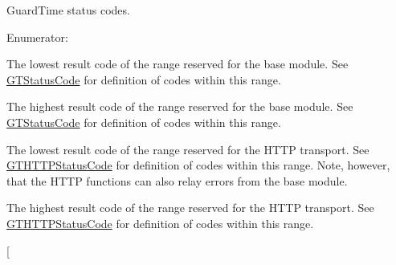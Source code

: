 GuardTime status codes. \begin{Desc}
\item[Enumerator: ]\par
\begin{description}
\item[{\em 
\hypertarget{group__common_gga43b0c0f44bcf02caf0c2866b1f647a35af146251f9857673f1f5dac74ae9fc33d}{
GTBASE\_\-LOWEST}
\label{group__common_gga43b0c0f44bcf02caf0c2866b1f647a35af146251f9857673f1f5dac74ae9fc33d}
}]The lowest result code of the range reserved for the base module. See \hyperlink{group__common_ga43b0c0f44bcf02caf0c2866b1f647a35}{GTStatusCode} for definition of codes within this range. \item[{\em 
\hypertarget{group__common_gga43b0c0f44bcf02caf0c2866b1f647a35ad069ecd772334533f3fffeb36ff56883}{
GTBASE\_\-HIGHEST}
\label{group__common_gga43b0c0f44bcf02caf0c2866b1f647a35ad069ecd772334533f3fffeb36ff56883}
}]The highest result code of the range reserved for the base module. See \hyperlink{group__common_ga43b0c0f44bcf02caf0c2866b1f647a35}{GTStatusCode} for definition of codes within this range. \item[{\em 
\hypertarget{group__common_gga43b0c0f44bcf02caf0c2866b1f647a35a482dd722dd3a434c49cf697238afece1}{
GTHTTP\_\-LOWEST}
\label{group__common_gga43b0c0f44bcf02caf0c2866b1f647a35a482dd722dd3a434c49cf697238afece1}
}]The lowest result code of the range reserved for the HTTP transport. See \hyperlink{group__http_ga9f42032eb2905e40ee6fe84e0dfc03c2}{GTHTTPStatusCode} for definition of codes within this range. Note, however, that the HTTP functions can also relay errors from the base module. \item[{\em 
\hypertarget{group__common_gga43b0c0f44bcf02caf0c2866b1f647a35ac72fe66798a566f300fdd86e060fd856}{
GTHTTP\_\-HIGHEST}
\label{group__common_gga43b0c0f44bcf02caf0c2866b1f647a35ac72fe66798a566f300fdd86e060fd856}
}]The highest result code of the range reserved for the HTTP transport. See \hyperlink{group__http_ga9f42032eb2905e40ee6fe84e0dfc03c2}{GTHTTPStatusCode} for definition of codes within this range. \item[{\em 
}
\end{description}
\end{Desc}
